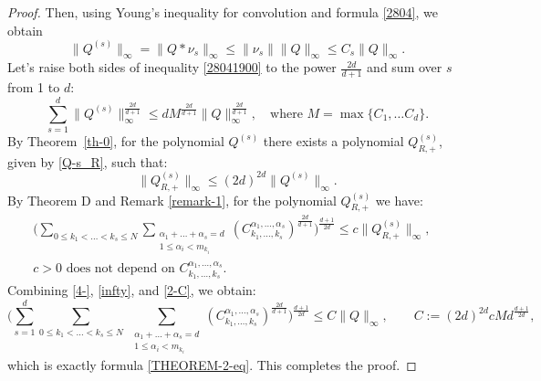 \documentclass[12pt]{article}
\begin{document}
\begin{proof}
		Then, using Young's inequality for convolution and formula \eqref{2804}, we obtain 
		\begin{equation} \label{28041900}
			\|Q^{(s)} \|_{\infty} =\|Q * \nu_s \|_{\infty}  \le \|\nu_s\|\|Q \|_{\infty}  \le C_s\|Q \|_{\infty}.
		\end{equation}
		Let's raise both sides of inequality \eqref{28041900} to the power $\frac{2d}{d+1}$ and sum over $s$ from 1 to $d$:
		\begin{equation} \label{4-}
			\sum_{s=1}^{d}\|Q^{(s)}\|_{\infty}^{\frac{2d}{d+1}} \le d M^{\frac{2d}{d+1}}\|Q\|_{\infty}^{\frac{2d}{d+1}}, \quad \text{where $M=\max\{C_1, \ldots C_{d}\}$.}
		\end{equation}
		By Theorem~\ref{th-0}, for the polynomial $Q^{(s)}$ there exists a polynomial $Q^{(s)}_{R,+}$, given by \eqref{Q-s_R}, such that:
		\begin{equation} \label{infty}
			\|Q^{(s)}_{R, +}\|_{\infty} \le (2d)^{2d}\|Q^{(s)}\|_{\infty}.
		\end{equation}
		By Theorem D and Remark \ref{remark-1}, for the polynomial $Q^{(s)}_{R, +}$ we have:
		\begin{equation} \label{2-C}
        \begin{split}
            \biggl(\sum_{0\le k_1 < \ldots < k_s \le N}\sum_{\substack{\alpha_1+\ldots+\alpha_s = d \\ 1 \le \alpha_i < m_{k_i}}} \left(C_{k_1, \ldots, k_s}^{\alpha_1, \ldots, \alpha_s}\right)^{\frac{2d}{d+1}}\biggl)^{\frac{d+1}{2d}} \le c\|Q^{(s)}_{R, +}\|_{\infty}, & \\
            \text{$c>0$ does not depend on $C_{k_1, \ldots, k_s}^{\alpha_1, \ldots, \alpha_s}$}. &
        \end{split}
		\end{equation}
		Combining \eqref{4-}, \eqref{infty}, and \eqref{2-C}, we obtain:
		\[
		\biggl(\sum_{s=1}^{d}\sum_{0\le k_1 < \ldots < k_s \le N} \; \sum_{\substack{\alpha_1+\ldots+\alpha_s = d \\ 1 \le \alpha_i < m_{k_i}}} \left(C_{k_1, \ldots, k_s}^{\alpha_1, \ldots, \alpha_s}\right)^{\frac{2d}{d+1}}\biggl)^{\frac{d+1}{2d}}  \le C\|Q\|_{\infty}, \qquad C := (2d)^{2d}cMd^{\frac{d+1}{2d}},
		\]
	which is exactly formula \eqref{THEOREM-2-eq}. This completes the proof.
	\end{proof}
\end{document}

